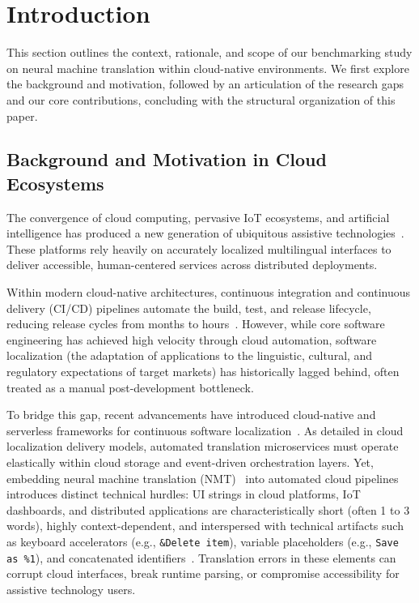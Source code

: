 \documentclass[pdflatex,sn-mathphys-num]{sn-jnl}
\begin{document}
\maketitle

\section{Introduction}

This section outlines the context, rationale, and scope of our benchmarking study on neural machine translation within cloud-native environments. We first explore the background and motivation, followed by an articulation of the research gaps and our core contributions, concluding with the structural organization of this paper.

\subsection{Background and Motivation in Cloud Ecosystems}

The convergence of cloud computing, pervasive IoT ecosystems, and artificial intelligence has produced a new generation of ubiquitous assistive technologies~\cite{1,2,3,4}. These platforms rely heavily on accurately localized multilingual interfaces to deliver accessible, human-centered services across distributed deployments.

Within modern cloud-native architectures, continuous integration and continuous delivery (CI/CD) pipelines automate the build, test, and release lifecycle, reducing release cycles from months to hours~\cite{5,6}. However, while core software engineering has achieved high velocity through cloud automation, software localization (the adaptation of applications to the linguistic, cultural, and regulatory expectations of target markets) has historically lagged behind, often treated as a manual post-development bottleneck. 

To bridge this gap, recent advancements have introduced cloud-native and serverless frameworks for continuous software localization~\cite{7}. As detailed in cloud localization delivery models, automated translation microservices must operate elastically within cloud storage and event-driven orchestration layers. Yet, embedding neural machine translation (NMT)~\cite{8} into automated cloud pipelines introduces distinct technical hurdles: UI strings in cloud platforms, IoT dashboards, and distributed applications are characteristically short (often 1 to 3 words), highly context-dependent, and interspersed with technical artifacts such as keyboard accelerators (e.g., \texttt{\&Delete item}), variable placeholders (e.g., \texttt{Save as \%1}), and concatenated identifiers~\cite{9,10}. Translation errors in these elements can corrupt cloud interfaces, break runtime parsing, or compromise accessibility for assistive technology users.
\end{document}
